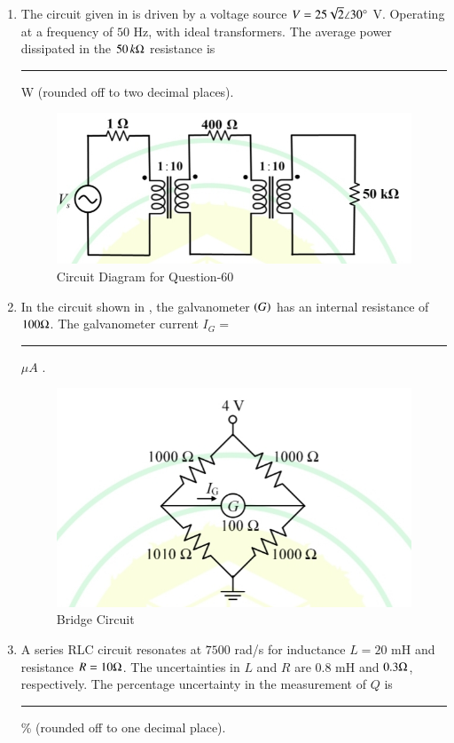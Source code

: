 \documentclass[journal,12pt,onecolumn]{IEEEtran}
\theoremstyle{remark}
\begin{document}
\begin{enumerate}
\item The circuit given in  is driven by a voltage source $V=25\sqrt{2}\angle 30\degree$ V. Operating at a frequency of $50$ Hz, with ideal transformers. The average power dissipated in the $50\,k\ohm$ resistance is \rule{1.5cm}{0.4pt} W (rounded off to two decimal places).
\par\hfill{}
\begin{figure}[H]
\centering
\includegraphics[width=0.6\columnwidth]{Figs/Q-60.jpg}
\caption{Circuit Diagram for Question-60}
\label{60}
\end{figure}


\item In the circuit shown in , the galvanometer $\left(G\right)$ has an internal resistance of $100\ohm$. The galvanometer current $I_G=$ \rule{1.5cm}{0.4pt} $\mu A$ .
\par\hfill{}
\begin{figure}[H]
\centering
\includegraphics[width=0.5\columnwidth]{Figs/Q-61.jpg}
\caption{Bridge Circuit}
\label{61}
\end{figure}


\item A series RLC circuit resonates at $7500$ rad/s for inductance $L=20$ mH and resistance $R=10\ohm$. The uncertainties in $L$ and $R$ are $0.8$ mH and $0.3\ohm$, respectively. The percentage uncertainty in the measurement of $Q$ is \rule{1.5cm}{0.4pt}\% (rounded off to one decimal place). \par\hfill{}



\end{enumerate}
\end{document}

